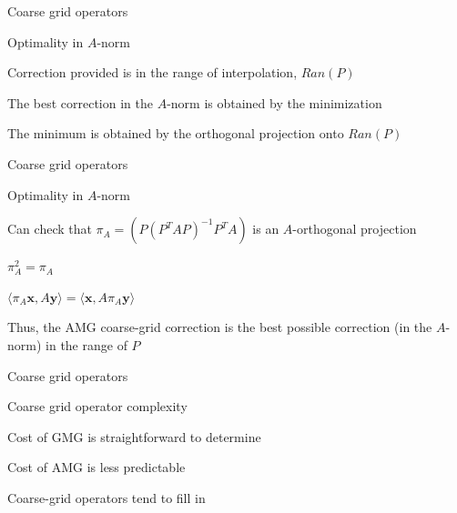 \documentclass[18pt,xcolor=table]{beamer}
\begin{document}
\begin{frame}{Coarse grid operators}
\begin{block}{Optimality in $A$-norm}
\bit
\item Correction provided is in the range of interpolation, $Ran(P)$
\item The best correction in the $A$-norm is obtained by the minimization
\item The minimum is obtained by the orthogonal projection onto $Ran(P)$
\eit
\end{block}
\end{frame}

\begin{frame}{Coarse grid operators}
\begin{block}{Optimality in $A$-norm}
\bit
\item Can check that $\pi_A = (P(P^TAP)^{-1}P^TA)$ is an $A$-orthogonal projection
\bit
\item $\pi_A^2 = \pi_A$
\item $\langle \pi_A \mathbf{x}, A \mathbf{y} \rangle = \langle \mathbf{x}, A \pi_A\mathbf{y} \rangle$
\eit
\item Thus, the AMG coarse-grid correction is the best possible correction (in the $A$-norm) in the range of $P$
\eit
\end{block}
\end{frame}

\begin{frame}{Coarse grid operators}
\begin{block}{Coarse grid operator complexity}
\bit
\item Cost of GMG is straightforward to determine
\item Cost of AMG is less predictable
\item Coarse-grid operators tend to fill in
\eit
\end{block}
\end{frame}


\end{document}
